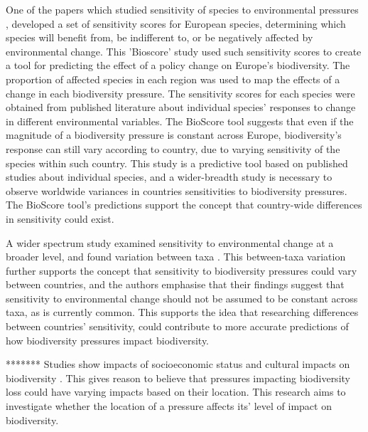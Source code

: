 \documentclass[11pt, a4paper, titlepage]{article}
\begin{document}
	One of the papers which studied sensitivity of species to environmental pressures \cite{louette2010bioscore}, developed a set of sensitivity scores for European species, determining which species will benefit from, be indifferent to, or be negatively affected by environmental change. This 'Bioscore' study used such sensitivity scores to create a tool for predicting the effect of a policy change on Europe's biodiversity. The proportion of  affected species in each region was used to map the effects of a change in each biodiversity pressure. The sensitivity scores for each species were obtained from published literature about individual species' responses to change in different environmental variables. The BioScore tool suggests that even if the magnitude of a biodiversity pressure is constant across Europe, biodiversity's response can still vary according to country, due to varying sensitivity of the species within such country. This study is a predictive tool based on published studies about individual species, and a wider-breadth study is necessary to observe worldwide variances in countries sensitivities to biodiversity pressures. The BioScore tool's predictions support the concept that country-wide differences in sensitivity could exist.
	
	A wider spectrum study examined sensitivity to environmental change at a broader level, and found variation between taxa \cite{sunday2015species}. This between-taxa variation further supports the concept that sensitivity to biodiversity pressures could vary between countries, and the authors emphasise that their findings suggest that sensitivity to environmental change should not be assumed to be constant across taxa, as is currently common. This supports the idea that researching differences between countries' sensitivity, could contribute to more accurate predictions of how biodiversity pressures impact biodiversity. 
	
	
	
	
	
	
	
	
	 
   	 
   	 
   	 ******* \newline
   	 Studies show impacts of socioeconomic status and cultural impacts on biodiversity \cite{kinzig2005effects}. This gives reason to believe that pressures impacting biodiversity loss could have varying impacts based on their location. This research aims to investigate whether the location of a pressure affects its' level of impact on biodiversity. 
\end{document}
